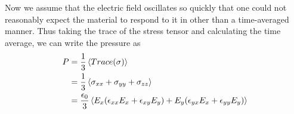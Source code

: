 \documentclass[aps, prl, twocolumn, groupedaddress]{revtex4-1}
\begin{document}
Now we assume that the electric field oscillates so quickly that one could not
reasonably expect the material to respond to it in other than a
time-averaged manner. Thus taking the trace of the stress tensor and calculating
the time average, we can write the pressure as
\begin{equation}
  \label{eq:pressure1}
  \begin{split}
                                                                                                                                                                                                                                                                                                                                                                                                                                                                                                                                P &= \frac{1}{3}\braket{Trace(\sigma)} \\
                                                                                                                                                                                                                                                                                                                                                                                                                                                                                                                                &= \frac{1}{3}\braket{\sigma_{xx} + \sigma_{yy} + \sigma_{zz}} \\
                                                                                                                                                                                                                                                                                                                                                                                                                                                                                                                                &= \frac{\epsilon_0}{3}\braket{E_x(\epsilon_{xx}E_x + \epsilon_{xy}E_y) + E_y(\epsilon_{yx}E_x
                                                                                                                                                                                                                                                                                                                                                                                                                                                                                                                                  + \epsilon_{yy}E_y)}\\

\end{split}
\end{equation}
\end{document}
